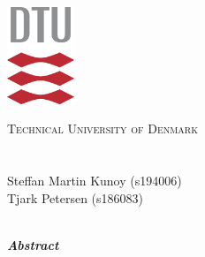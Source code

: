 \begin{titlepage}
    \begin{center}
        \includegraphics[width=0.15\textwidth]{Report/frontmatter/dtu.pdf}\par\vspace{0.5cm}
    
        {\scshape\LARGE Technical University of Denmark\\}
    	\vspace{0.5cm}
        {\large \coursenumber\;\coursename}\\
    	\vspace{1.5cm}
    	{\huge\bfseries \projectnamelong\\}
    	\vspace{1.5cm}
    	{\Large Steffan Martin Kunoy (s194006)\\}
            {\Large Tjark Petersen (s186083)\\}
        \vspace{1cm}
    	{\Large \thedate\\}
        \vspace{1cm}

    \end{center}    
    \textbf{\textit{Abstract}}\\
    
 \vfill
\end{titlepage}